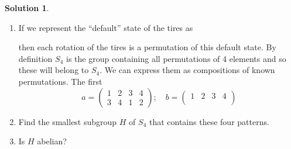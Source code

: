 \documentclass[10pt]{article}
\theoremstyle{definition}
\newtheorem{soln}{Solution}
\begin{document}
\begin{soln} ~\\
  \begin{enumerate}[label=(\alph*)]
    \item If we represent the ``default'' state of the tires as
          \begin{center}
          \end{center}
          then each rotation of the tires is a permutation of this default state. By definition
          $S_4$ is the group containing all permutations of 4 elements and so these will belong to $S_4$.
          We can express them as compositions of known permutations. The first 
          $$a=\begin{pmatrix}
            1&2&3&4\\
            3&4&1&2
          \end{pmatrix};\quad b=\begin{pmatrix}
            1&2&3&4\\
            
          \end{pmatrix}$$
    \item Find the smallest subgroup $H$ of $S_4$ that contains these four
          patterns.
    \item Is $H$ abelian?
  \end{enumerate}
\end{soln}
\end{document}
